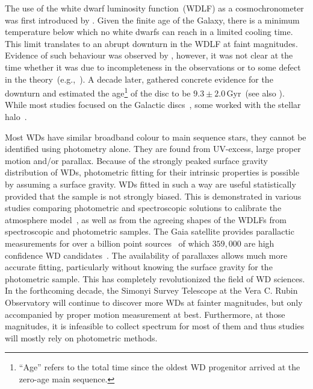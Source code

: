 \documentclass[fleqn,usenatbib]{mnras}
\begin{document}
The use of the white dwarf luminosity function~(WDLF) as a cosmochronometer was
first introduced by \citet{1959ApJ...129..243S}. Given the finite age of the
Galaxy, there is a minimum temperature below which no white dwarfs can reach in
a limited cooling time. This limit translates to an abrupt downturn in the WDLF
at faint magnitudes. Evidence of such behaviour was observed by
\citet{1979ApJ...233..226L}, however, it was not clear at the time whether it
was due to incompleteness in the observations or to some defect in the
theory~(e.g.,~\citealp{1984ApJ...282..615I}). A decade later,
\citet{1987ApJ...315L..77W} gathered concrete evidence for the downturn and
estimated the age\footnote{``Age'' refers to the total time since the oldest
WD progenitor arrived at the zero-age main sequence.} of the disc to be
$9.3 \pm 2.0$\,Gyr~(see also \citealt{1988ApJ...332..891L}). While most studies
focused on the Galactic discs~\citep{1989LNP...328...15L, 1992ApJ...386..539W,
1995LNP...443...24O, 1998ApJ...497..294L, 1999MNRAS.306..736K,
2012ApJS..199...29G, 2021A&A...649A...6G}, some worked with the stellar
halo~\citep{2006AJ....131..571H, 2011MNRAS.417...93R, 2017AJ....153...10M,
2019MNRAS.482..715L}. 
 
Most WDs have similar broadband colour to main sequence stars, they cannot be
identified using photometry alone. They are found from UV-excess, large
proper motion and/or parallax. Because of the strongly peaked surface gravity
distribution of WDs, photometric fitting for their intrinsic properties
is possible by assuming a surface gravity. WDs fitted in such a way are useful
statistically provided that the sample is not strongly biased. This is
demonstrated in various studies comparing photometric and spectroscopic
solutions to calibrate the atmosphere
model~\citep{2019ApJ...871..169G, 2019ApJ...882..106G}, as well as from the
agreeing shapes of the WDLFs from spectroscopic and photometric samples. The
Gaia satellite provides parallactic measurements for over a billion point
sources~\citep{2021A&A...649A...1G, 2021AJ....161..147B} of which $359,000$
are high confidence WD candidates~\citep[][hereafter, GF21]{2021MNRAS.508.3877G}.
The availability of parallaxes allows much more accurate fitting, particularly
without knowing the surface gravity for the photometric sample. This has
completely  revolutionized the field of WD sciences. In the forthcoming decade,
the Simonyi Survey Telescope at the Vera C. Rubin Observatory will continue to
discover more WDs at fainter magnitudes, but only accompanied by proper
motion measurement at best. Furthermore, at those magnitudes, it is infeasible
to collect spectrum for most of them and thus studies will mostly rely on
photometric methods.
\end{document}
